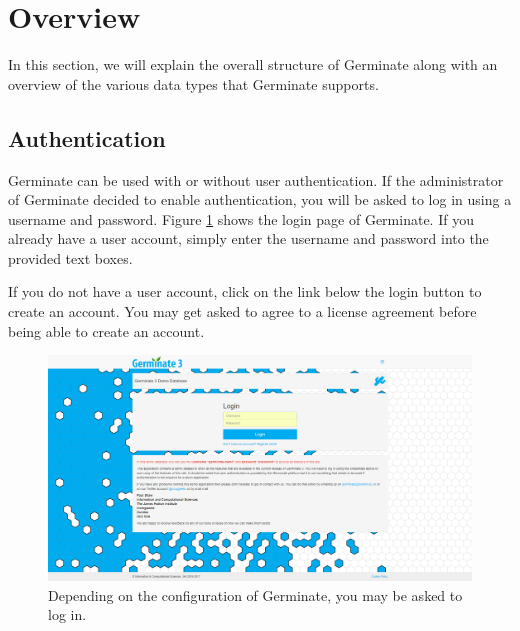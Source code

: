\section{Overview}
In this section, we will explain the overall structure of Germinate along with an overview of the various data types that Germinate supports.

\subsection{Authentication}
Germinate can be used with or without user authentication. If the administrator of Germinate decided to enable authentication, you will be asked to log in using a username and password. Figure \ref{fig:overview:login} shows the login page of Germinate. If you already have a user account, simply enter the username and password into the provided text boxes.

If you do not have a user account, click on the link below the login button to create an account. You may get asked to agree to a license agreement before being able to create an account.

\begin{figure}
	\centering
	\includegraphics[width=0.85\linewidth]{img/overview/login.png}
	\caption{Depending on the configuration of Germinate, you may be asked to log in.}
	\label{fig:overview:login}
\end{figure}

